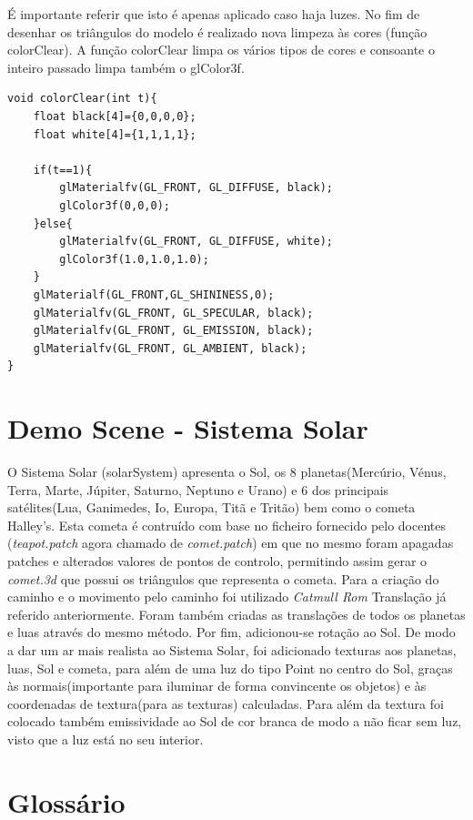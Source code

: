\documentclass{article}
\begin{document}
É importante referir que isto é apenas aplicado caso haja luzes.
No fim de desenhar os triângulos do modelo é realizado nova limpeza às cores (função colorClear).
A função colorClear limpa os vários tipos de cores e consoante o inteiro passado limpa também o glColor3f.
\begin{verbatim}
void colorClear(int t){
    float black[4]={0,0,0,0};
    float white[4]={1,1,1,1};

    if(t==1){
        glMaterialfv(GL_FRONT, GL_DIFFUSE, black);
        glColor3f(0,0,0);
    }else{
        glMaterialfv(GL_FRONT, GL_DIFFUSE, white);
        glColor3f(1.0,1.0,1.0);
    }
    glMaterialf(GL_FRONT,GL_SHININESS,0);
    glMaterialfv(GL_FRONT, GL_SPECULAR, black);
    glMaterialfv(GL_FRONT, GL_EMISSION, black);
    glMaterialfv(GL_FRONT, GL_AMBIENT, black);
}
\end{verbatim}

\section{Demo Scene - Sistema Solar}
O Sistema Solar (solarSystem) apresenta o Sol, os 8 planetas(Mercúrio, Vénus, Terra, Marte, Júpiter, Saturno, Neptuno e Urano) e 6 dos principais satélites(Lua, Ganimedes, Io, Europa, Titã e Tritão) bem como o cometa Halley's. Esta cometa é contruído com base no ficheiro fornecido pelo docentes (\textit{teapot.patch} agora chamado de \textit{comet.patch}) em que no mesmo foram apagadas patches e alterados valores de pontos de controlo, permitindo assim gerar o \textit{comet.3d} que possui os triângulos que representa o cometa. Para a criação do caminho e o movimento pelo caminho foi utilizado \textit{Catmull Rom} Translação já referido anteriormente. Foram também criadas as translações de todos os planetas e luas através do mesmo método. Por fim, adicionou-se rotação ao Sol. 
De modo a dar um ar mais realista ao Sistema Solar, foi adicionado texturas aos planetas, luas, Sol e cometa, para além de uma luz do tipo Point no centro do Sol, graças às normais(importante para iluminar de forma convincente os objetos) e às coordenadas de textura(para as texturas) calculadas. Para além da textura foi colocado também emissividade ao Sol de cor branca de modo a não ficar sem luz, visto que a luz está no seu interior.

\section{Glossário}
\end{document}

